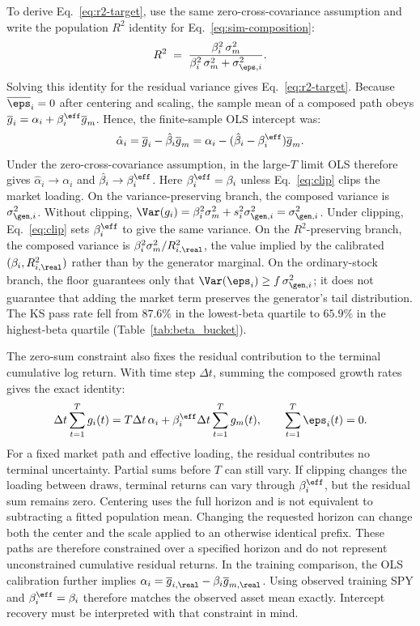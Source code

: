 To derive Eq.~\eqref{eq:r2-target}, use the same zero-cross-covariance
assumption and write the population $R^2$ identity for
Eq.~\eqref{eq:sim-composition}:
\begin{equation}
  R^2 \;=\; \frac{\beta_i^2\, \sigma_m^2}{\beta_i^2\, \sigma_m^2 + \sigma_{\eps,i}^2}.
\end{equation}
Solving this identity for the residual variance gives
Eq.~\eqref{eq:r2-target}.
Because $\overline{\eps}_i=0$ after centering and scaling, the sample
mean of a composed path obeys
$\overline{g}_i=\alpha_i+\beta_i^{\eff}\overline{g}_m$. Hence, the
finite-sample OLS intercept was:
\begin{equation}
  \hat\alpha_i
  = \overline{g}_i-\hat\beta_i\overline{g}_m
  = \alpha_i-(\hat\beta_i-\beta_i^{\eff})\overline{g}_m.
\end{equation}
Under the zero-cross-covariance assumption, in the large-$T$ limit OLS
therefore gives $\hat\alpha_i \to \alpha_i$ and
$\hat\beta_i \to \beta_i^{\eff}$. Here
$\beta_i^{\eff}=\beta_i$ unless Eq.~\eqref{eq:clip} clips the market
loading. On the variance-preserving branch, the composed variance is
$\sigma_{\gen,i}^2$. Without clipping,
$\Var(g_i) = \beta_i^2 \sigma_m^2 + s_i^2 \sigma_{\gen,i}^2
  = \sigma_{\gen,i}^2$. Under clipping, Eq.~\eqref{eq:clip} sets
$\beta_i^{\eff}$ to give the same variance. On the $R^2$-preserving
branch, the composed variance is
$\beta_i^2 \sigma_m^2 / R^2_{i,\real}$, the value implied by the
calibrated $(\beta_i, R^2_{i,\real})$ rather than by the generator
marginal. On the ordinary-stock branch, the floor guarantees only that
$\Var(\eps_i)\geq f\,\sigma_{\gen,i}^2$; it does not guarantee that
adding the market term preserves the generator's tail distribution.
The KS pass rate fell from $87.6\%$ in the lowest-beta quartile to
$65.9\%$ in the highest-beta quartile (Table~\ref{tab:beta_bucket}).

The zero-sum constraint also fixes the residual contribution to the
terminal cumulative log return. With time step $\Delta t$, summing the
composed growth rates gives the exact identity:
\begin{equation}
  \Delta t\sum_{t=1}^{T} g_i(t)
  = T\Delta t\,\alpha_i
    + \beta_i^{\eff}\Delta t\sum_{t=1}^{T}g_m(t),
  \qquad \sum_{t=1}^{T}\eps_i(t)=0.
  \label{eq:supp-zero-sum-terminal}
\end{equation}
For a fixed market path and effective loading, the residual contributes
no terminal uncertainty. Partial sums before $T$ can still vary. If
clipping changes the loading between draws, terminal returns can vary
through $\beta_i^{\eff}$, but the residual sum remains zero. Centering
uses the full horizon and is not equivalent to subtracting a fitted
population mean. Changing the requested horizon can change both the
center and the scale applied to an otherwise identical prefix. These
paths are therefore constrained over a specified horizon and do not
represent unconstrained cumulative residual returns. In the training
comparison, the OLS calibration further implies
$\alpha_i=\overline{g}_{i,\real}-\beta_i\overline{g}_{m,\real}$.
Using observed training SPY and $\beta_i^{\eff}=\beta_i$ therefore
matches the observed asset mean exactly. Intercept recovery must be
interpreted with that constraint in mind.

